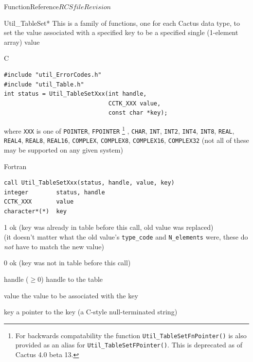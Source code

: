 \begin{cactuspart}{FunctionReference}{$RCSfile$}{$Revision$}

\begin{FunctionDescription}{Util\_TableSet*}
\label{Util-TableSet*}
This is a family of functions, one for each Cactus data type,
to set the value associated with a specified key to be a specified
single (1-element array) value

\begin{SynopsisSection}
\begin{Synopsis}{C}
\begin{verbatim}
#include "util_ErrorCodes.h"
#include "util_Table.h"
int status = Util_TableSetXxx(int handle,
                              CCTK_XXX value,
                              const char *key);
\end{verbatim}
where \verb|XXX| is one of
   \verb|POINTER|, \verb|FPOINTER|%
\footnote{%
	 For backwards compatability the function
	 {\tt Util\_TableSetFnPointer()} is also provided
	 as an alias for {\tt Util\_TableSetFPointer()}.
	 This is deprecated as of Cactus 4.0 beta 13.
	 }%
,
   \verb|CHAR|,
   \verb|INT|, \verb|INT2|, \verb|INT4|, \verb|INT8|,
   \verb|REAL|, \verb|REAL4|, \verb|REAL8|, \verb|REAL16|,
   \verb|COMPLEX|, \verb|COMPLEX8|, \verb|COMPLEX16|, \verb|COMPLEX32|
(not all of these may be supported on any given system)
\end{Synopsis}
\begin{Synopsis}{Fortran}
\begin{verbatim}
call Util_TableSetXxx(status, handle, value, key)
integer        status, handle
CCTK_XXX       value
character*(*)  key
\end{verbatim}
\end{Synopsis}
\end{SynopsisSection}

\begin{ResultSection}
\begin{Result}{\rm 1}
ok (key was already in table before this call, old value was replaced)\\
   (it doesn't matter what the old value's \verb|type_code| and
    \verb|N_elements| were, \ie{} these do {\em not\/} have to match
    the new value)
\end{Result}
\begin{Result}{\rm 0}
ok (key was not in table before this call)
\end{Result}
\end{ResultSection}

\begin{ParameterSection}
\begin{Parameter}{handle ($\ge 0$)}
handle to the table
\end{Parameter}
\begin{Parameter}{value}
the value to be associated with the key
\end{Parameter}
\begin{Parameter}{key}
a pointer to the key (a C-style null-terminated string)
\end{Parameter}
\end{ParameterSection}


\end{FunctionDescription}
\end{cactuspart}
